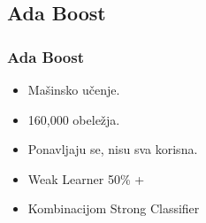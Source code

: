 \documentclass{beamer}
\begin{document}
\subsection{Ada Boost}
\begin{frame}
  \frametitle{Ada Boost}

  \begin{itemize}
  \item<1-> Mašinsko učenje.
  \item<1-> 160,000 obeležja.
  \item<1-> Ponavljaju se, nisu sva korisna.
  \item<1-> Weak Learner 50\% +
  \item<1-> Kombinacijom Strong Classifier
  \end{itemize}

\end{frame}
\end{document}
